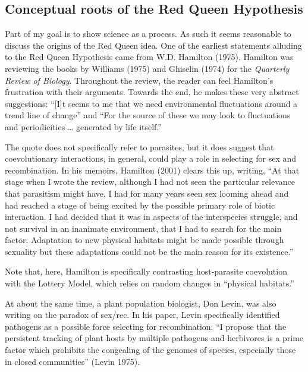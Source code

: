 \documentclass[
  letterpaper,
]{book}
\begin{document}
\subsection{Conceptual roots of the Red Queen
Hypothesis}\label{conceptual-roots-of-the-red-queen-hypothesis}

Part of my goal is to show science as a process. As such it seems
reasonable to discuss the origins of the Red Queen idea. One of the
earliest statements alluding to the Red Queen Hypothesis came from W.D.
Hamilton (1975). Hamilton was reviewing the books by Williams (1975) and
Ghiselin (1974) for the \emph{Quarterly Review of Biology}. Throughout
the review, the reader can feel Hamilton's frustration with their
arguments. Towards the end, he makes these very abstract suggestions:
``{[}I{]}t seems to me that we need environmental fluctuations around a
trend line of change'' and ``For the source of these we may look to
fluctuations and periodicities \ldots{} generated by life itself.''

The quote does not specifically refer to parasites, but it does suggest
that coevolutionary interactions, in general, could play a role in
selecting for sex and recombination. In his memoirs, Hamilton (2001)
clears this up, writing, ``At that stage when I wrote the review,
although I had not seen the particular relevance that parasitism might
have, I had for many years seen sex looming ahead and had reached a
stage of being excited by the possible primary role of biotic
interaction. I had decided that it was in aspects of the interspecies
struggle, and not survival in an inanimate environment, that I had to
search for the main factor. Adaptation to new physical habitats might be
made possible through sexuality but these adaptations could not be the
main reason for its existence.''

Note that, here, Hamilton is specifically contrasting host-parasite
coevolution with the Lottery Model, which relies on random changes in
``physical habitats.''

At about the same time, a plant population biologist, Don Levin, was
also writing on the paradox of sex/rec. In his paper, Levin specifically
identified pathogens as a possible force selecting for recombination:
``I propose that the persistent tracking of plant hosts by multiple
pathogens and herbivores is a prime factor which prohibits the
congealing of the genomes of species, especially those in closed
communities'' (Levin 1975).
\end{document}

